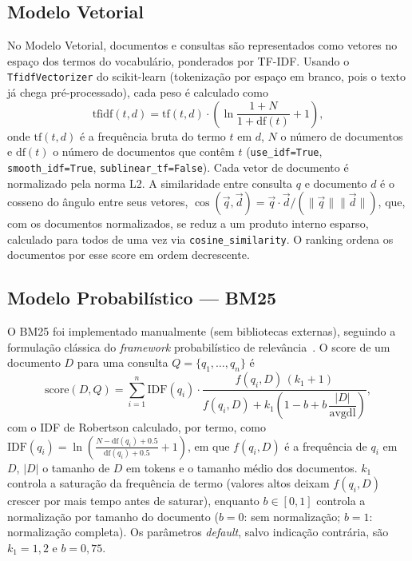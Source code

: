 \documentclass[runningheads]{llncs}
\begin{document}
\subsection{Modelo Vetorial}

No Modelo Vetorial, documentos e consultas são representados como vetores no espaço dos termos do vocabulário, ponderados por TF-IDF. Usando o \texttt{TfidfVectorizer} do scikit-learn (tokenização por espaço em branco, pois o texto já chega pré-processado), cada peso é calculado como
\begin{equation}
\text{tfidf}(t,d) = \text{tf}(t,d) \cdot \left(\ln\frac{1+N}{1+\text{df}(t)} + 1\right),
\end{equation}
onde $\text{tf}(t,d)$ é a frequência bruta do termo $t$ em $d$, $N$ o número de documentos e $\text{df}(t)$ o número de documentos que contêm $t$ (\texttt{use\_idf=True}, \texttt{smooth\_idf=True}, \texttt{sublinear\_tf=False}). Cada vetor de documento é normalizado pela norma L2. A similaridade entre consulta $q$ e documento $d$ é o cosseno do ângulo entre seus vetores, $\cos(\vec{q},\vec{d})=\vec{q}\cdot\vec{d}/(\lVert\vec{q}\rVert\lVert\vec{d}\rVert)$, que, com os documentos normalizados, se reduz a um produto interno esparso, calculado para todos de uma vez via \texttt{cosine\_similarity}. O ranking ordena os documentos por esse score em ordem decrescente.

\vspace{-1.0em}
\subsection{Modelo Probabilístico --- BM25}

O BM25 foi implementado manualmente (sem bibliotecas externas), seguindo a formulação clássica do \emph{framework} probabilístico de relevância~\cite{ref_bm25}. O score de um documento $D$ para uma consulta $Q = \{q_1,\dots,q_n\}$ é
\begin{equation}
\text{score}(D,Q) = \sum_{i=1}^{n} \text{IDF}(q_i) \cdot \frac{f(q_i,D)\,(k_1+1)}{f(q_i,D) + k_1\left(1 - b + b\,\dfrac{|D|}{\text{avgdl}}\right)},
\end{equation}
com o IDF de Robertson calculado, por termo, como $\text{IDF}(q_i) = \ln\!\left(\frac{N - \text{df}(q_i) + 0.5}{\text{df}(q_i) + 0.5} + 1\right)$, em que $f(q_i,D)$ é a frequência de $q_i$ em $D$, $|D|$ o tamanho de $D$ em tokens e  o tamanho médio dos documentos. $k_1$ controla a saturação da frequência de termo (valores altos deixam $f(q_i,D)$ crescer por mais tempo antes de saturar), enquanto $b \in [0,1]$ controla a normalização por tamanho do documento ($b=0$: sem normalização; $b=1$: normalização completa). Os parâmetros \emph{default}, salvo indicação contrária, são $k_1=1{,}2$ e $b=0{,}75$.
\end{document}

